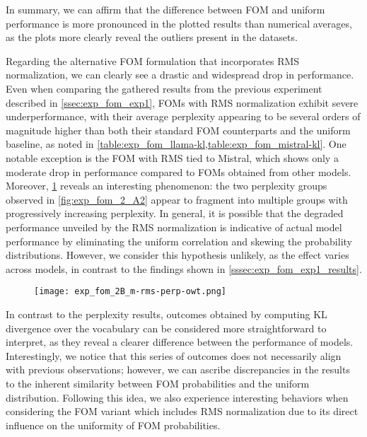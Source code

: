 In summary, we can affirm that the difference between FOM and uniform performance is more pronounced in the plotted results than numerical averages, as the plots more clearly reveal the outliers present in the datasets.

Regarding the alternative FOM formulation that incorporates RMS normalization, we can clearly see a drastic and widespread drop in performance.
Even when comparing the gathered results from the previous experiment described in \cref{ssec:exp_fom_exp1}, FOMs with RMS normalization exhibit severe underperformance, with their average perplexity appearing to be several orders of magnitude higher than both their standard FOM counterparts and the uniform baseline, as noted in \cref{table:exp_fom_llama-kl,table:exp_fom_mistral-kl}.
One notable exception is the FOM with RMS tied to Mistral, which shows only a moderate drop in performance compared to FOMs obtained from other models.
Moreover, \cref{fig:exp_fom_2_B} reveals an interesting phenomenon: the two perplexity groups observed in \cref{fig:exp_fom_2_A2} appear to fragment into multiple groups with progressively increasing perplexity.
In general, it is possible that the degraded performance unveiled by the RMS normalization is indicative of actual model performance by eliminating the uniform correlation and skewing the probability distributions.
However, we consider this hypothesis unlikely, as the effect varies across models, in contrast to the findings shown in \cref{sssec:exp_fom_exp1_results}.

\begin{figure}[t!]
    \centering
    \texttt{[image: exp\_fom\_2B\_m-rms-perp-owt.png]}
    \caption{}
    \label{fig:exp_fom_2_B}
\end{figure}

In contrast to the perplexity results, outcomes obtained by computing KL divergence over the vocabulary can be considered more straightforward to interpret, as they reveal a clearer difference between the performance of models.
Interestingly, we notice that this series of outcomes does not necessarily align with previous observations; however, we can ascribe discrepancies in the results to the inherent similarity between FOM probabilities and the uniform distribution.
Following this idea, we also experience interesting behaviors when considering the FOM variant which includes RMS normalization due to its direct influence on the uniformity of FOM probabilities.

